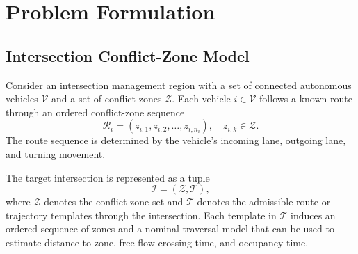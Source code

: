 \section{Problem Formulation}
\label{sec:problem_formulation}

\subsection{Intersection Conflict-Zone Model}
Consider an intersection management region with a set of connected autonomous vehicles $\mathcal{V}$ and a set of conflict zones $\mathcal{Z}$. Each vehicle $i \in \mathcal{V}$ follows a known route through an ordered conflict-zone sequence
\begin{equation}
  \mathcal{R}_i = \left(z_{i,1}, z_{i,2}, \ldots, z_{i,n_i}\right), \quad z_{i,k} \in \mathcal{Z}.
\end{equation}
The route sequence is determined by the vehicle's incoming lane, outgoing lane, and turning movement.

\begin{addedtwoblock}
The target intersection is represented as a tuple
\begin{equation}
  \mathcal{I}=\left(\mathcal{Z},\mathcal{T}\right),
  \label{eq:intersection_tuple}
\end{equation}
where $\mathcal{Z}$ denotes the conflict-zone set and $\mathcal{T}$ denotes the admissible route or trajectory templates through the intersection. Each template in $\mathcal{T}$ induces an ordered sequence of zones and a nominal traversal model that can be used to estimate distance-to-zone, free-flow crossing time, and occupancy time.
\end{addedtwoblock}

